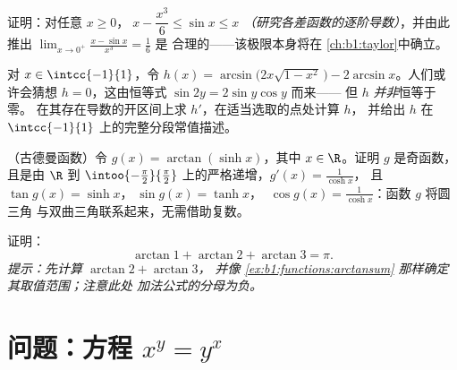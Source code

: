 \begin{exercise}[$\star\star$]\label{exo:b1:functions:9}
证明：对任意 $x \geq 0$，$\;x - \dfrac{x^3}{6} \leq \sin x \leq
x$ \emph{（研究各差函数的逐阶导数）}，并由此
推出 $\lim_{x \to 0^+} \frac{x - \sin x}{x^3} = \frac 16$ 是
合理的——该极限本身将在
\cref{ch:b1:taylor}中确立。
\end{exercise}

\begin{exercise}[$\star\star\star$]\label{exo:b1:functions:10}
对 $x \in \intcc{-1}{1}$，令
$h(x) = \arcsin\bigl(2x\sqrt{1 - x^2}\,\bigr) - 2\arcsin x$。人们或许会猜想
$h = 0$，这由恒等式 $\sin 2y = 2\sin y\cos y$ 而来——
但 $h$ \emph{并非}恒等于零。
在其存在导数的开区间上求 $h'$，在适当选取的点处计算 $h$，
并给出 $h$ 在 $\intcc{-1}{1}$ 上的完整分段常值描述。
\end{exercise}

\begin{exercise}[$\star\star\star$]\label{exo:b1:functions:11}
（古德曼函数）令 $g(x) = \arctan(\sinh x)$，其中 $x \in \R$。证明
$g$ 是奇函数，且是由 $\R$ 到
$\intoo{-\frac\pi2}{\frac\pi2}$ 上的严格递增，$g'(x) = \frac{1}{\cosh x}$，
且 $\tan g(x) = \sinh x$，$\;\sin g(x) = \tanh x$，
$\;\cos g(x) = \frac{1}{\cosh x}$：函数 $g$ 将圆三角
与双曲三角联系起来，无需借助复数。
\end{exercise}

\begin{exercise}[$\star\star$]\label{exo:b1:functions:12}
证明：
\[
\arctan 1 + \arctan 2 + \arctan 3 = \pi .
\]
\emph{提示：先计算 $\arctan 2 + \arctan 3$，
并像 \cref{ex:b1:functions:arctansum} 那样确定其取值范围；注意此处
加法公式的分母为负。}
\end{exercise}

\section{问题：方程 $x^y = y^x$}

